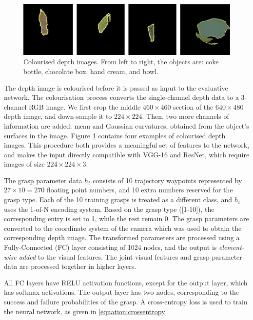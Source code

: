 \begin{figure}[h]
  \includegraphics[width=0.9\linewidth]{images/colourDepth.pdf}
  \caption[Colourised depth images.]{Colourised depth images. From left to right, the objects are: coke bottle, chocolate box, hand cream, and bowl.}
\label{fig:colorisedDepth}
\end{figure}

The depth image is colourised before it is passed as input to the evaluative network. The colourisation process converts the single-channel depth data to a 3-channel RGB image. We first crop the middle $460 \times 460$ section of the $640 \times 480$ depth image, and down-sample it to $224 \times 224$. Then, two more channels of information are added: mean and Gaussian curvatures, obtained from the object's surfaces in the image. Figure \ref{fig:colorisedDepth} contains four examples of colourised depth images. This procedure both provides a meaningful set of features to the network, and makes the input directly compatible with VGG-16 and ResNet, which require images of size $224 \times 224 \times 3$.

The grasp parameter data $h_t$ consists of 10 trajectory waypoints represented by $27 \times 10 = 270$ floating point numbers, and 10 extra numbers reserved for the grasp type. Each of the 10 training grasps is treated as a different class, and $h_t$ uses the 1-of-N encoding system. Based on the grasp type ([1-10]), the corresponding entry is set to 1, while the rest remain 0. The grasp parameters are converted to the coordinate system of the camera which was used to obtain the corresponding depth image. The transformed parameters are processed using a Fully-Connected (FC) layer consisting of 1024 nodes, and the output is \textit{element-wise added} to the visual features. The joint visual features and grasp parameter data are processed together in higher layers.

All FC layers have RELU activation functions, except for the output layer, which has softmax activations. The output layer has two nodes, corresponding to the success and failure probabilities of the grasp. A cross-entropy loss is used to train the neural network, as given in \eq\ref{equation:crossentropy}.

